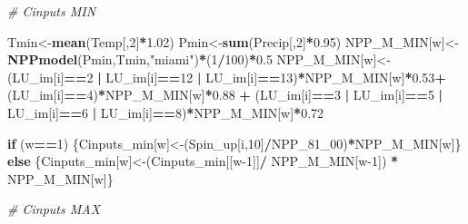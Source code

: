 \documentclass[
  10pt,
  b5paper,
]{book}
\newenvironment{Shaded}{\begin{snugshade}}{\end{snugshade}}
\newcommand{\CommentTok}[1]{\textcolor[rgb]{0.56,0.35,0.01}{\textit{#1}}}
\newcommand{\ControlFlowTok}[1]{\textcolor[rgb]{0.13,0.29,0.53}{\textbf{#1}}}
\newcommand{\DecValTok}[1]{\textcolor[rgb]{0.00,0.00,0.81}{#1}}
\newcommand{\FloatTok}[1]{\textcolor[rgb]{0.00,0.00,0.81}{#1}}
\newcommand{\KeywordTok}[1]{\textcolor[rgb]{0.13,0.29,0.53}{\textbf{#1}}}
\newcommand{\NormalTok}[1]{#1}
\newcommand{\OperatorTok}[1]{\textcolor[rgb]{0.81,0.36,0.00}{\textbf{#1}}}
\newcommand{\StringTok}[1]{\textcolor[rgb]{0.31,0.60,0.02}{#1}}
\begin{document}
\begin{Shaded}
\begin{Highlighting}[]
{\CommentTok{# Cinputs MIN}

\NormalTok{Tmin<-}\KeywordTok{mean}\NormalTok{(Temp[,}\DecValTok{2}\NormalTok{]}\OperatorTok{*}\FloatTok{1.02}\NormalTok{)}
\NormalTok{Pmin<-}\KeywordTok{sum}\NormalTok{(Precip[,}\DecValTok{2}\NormalTok{]}\OperatorTok{*}\FloatTok{0.95}\NormalTok{)}
\NormalTok{NPP_M_MIN[w]<-}\KeywordTok{NPPmodel}\NormalTok{(Pmin,Tmin,}\StringTok{"miami"}\NormalTok{)}\OperatorTok{*}\NormalTok{(}\DecValTok{1}\OperatorTok{/}\DecValTok{100}\NormalTok{)}\OperatorTok{*}\FloatTok{0.5}
\NormalTok{NPP_M_MIN[w]<-(LU_im[i]}\OperatorTok{==}\DecValTok{2} \OperatorTok{|}\StringTok{ }\NormalTok{LU_im[i]}\OperatorTok{==}\DecValTok{12} \OperatorTok{|}\StringTok{ }\NormalTok{LU_im[i]}\OperatorTok{==}\DecValTok{13}\NormalTok{)}\OperatorTok{*}\NormalTok{NPP_M_MIN[w]}\OperatorTok{*}\FloatTok{0.53}\OperatorTok{+}\StringTok{ }\NormalTok{(LU_im[i]}\OperatorTok{==}\DecValTok{4}\NormalTok{)}\OperatorTok{*}\NormalTok{NPP_M_MIN[w]}\OperatorTok{*}\FloatTok{0.88} \OperatorTok{+}\StringTok{ }\NormalTok{(LU_im[i]}\OperatorTok{==}\DecValTok{3} \OperatorTok{|}\StringTok{ }\NormalTok{LU_im[i]}\OperatorTok{==}\DecValTok{5} \OperatorTok{|}\StringTok{ }\NormalTok{LU_im[i]}\OperatorTok{==}\DecValTok{6} \OperatorTok{|}\StringTok{ }\NormalTok{LU_im[i]}\OperatorTok{==}\DecValTok{8}\NormalTok{)}\OperatorTok{*}\NormalTok{NPP_M_MIN[w]}\OperatorTok{*}\FloatTok{0.72}

\ControlFlowTok{if}\NormalTok{ (w}\OperatorTok{==}\DecValTok{1}\NormalTok{) \{Cinputs_min[w]<-(Spin_up[i,}\DecValTok{10}\NormalTok{]}\OperatorTok{/}\NormalTok{NPP_}\DecValTok{81}\NormalTok{_}\DecValTok{00}\NormalTok{)}\OperatorTok{*}\NormalTok{NPP_M_MIN[w]\} }\ControlFlowTok{else}\NormalTok{ \{Cinputs_min[w]<-(Cinputs_min[[w}\DecValTok{-1}\NormalTok{]]}\OperatorTok{/}\StringTok{ }\NormalTok{NPP_M_MIN[w}\DecValTok{-1}\NormalTok{]) }\OperatorTok{*}\StringTok{ }\NormalTok{NPP_M_MIN[w]\} }

\CommentTok{# Cinputs MAX}

}
\end{Highlighting}
\end{Shaded}
\end{document}

